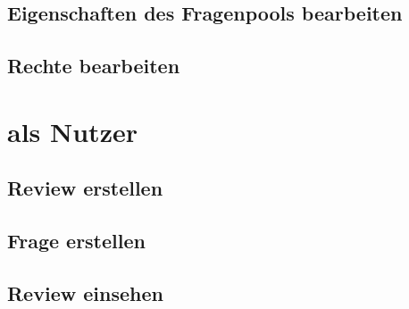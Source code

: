 \documentclass[12pt,a4paper]{scrreprt}
\begin{document}
		\subsection{Eigenschaften des Fragenpools bearbeiten}
		
		\subsection{Rechte bearbeiten}
	\section{als Nutzer}
		\subsection{Review erstellen}
		\subsection{Frage erstellen}
		\subsection{Review einsehen}
\end{document}
